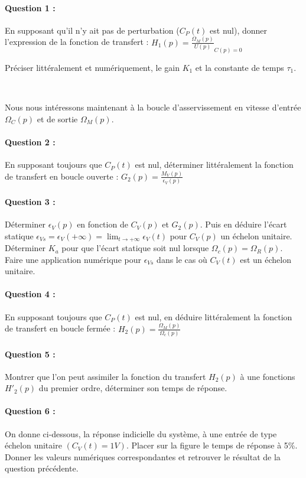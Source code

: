 \paragraph{Question 1 :} En supposant qu'il n'y ait pas de perturbation ($C_P(t)$ est nul), donner l'expression de la fonction de transfert : $H_1(p)=\frac{\Omega_M(p)}{U(p)}_{C(p)=0}$

Préciser littéralement et numériquement, le gain $K_1$ et la constante de temps $\tau_1$.

~\

Nous nous intéressons maintenant à la boucle d'asservissement en vitesse d'entrée $\Omega_C(p)$ et de sortie $\Omega_M(p)$.

\paragraph{Question 2 :} En supposant toujours que $C_P(t)$ est nul, déterminer littéralement la fonction de transfert en boucle ouverte : $G_2(p)=\frac{M_V(p)}{\epsilon_V(p)}$	

\paragraph{Question 3 :} Déterminer $\epsilon_V(p)$ en fonction de $C_V(p)$ et $G_2(p)$. Puis en déduire l'écart statique
$ \displaystyle \epsilon_{Vs}=\epsilon_V(+\infty)=\lim_{t\rightarrow + \infty}\epsilon_V(t)$ pour $C_V(p)$ un échelon unitaire. Déterminer $K_a$ pour que l'écart statique soit nul lorsque $\Omega_c(p)=\Omega_R(p)$. Faire une application numérique pour $\epsilon_{Vs}$ dans le cas où $C_V(t)$ est un échelon unitaire.

\paragraph{Question 4 :} En supposant toujours que $C_P(t)$ est nul, en déduire littéralement la fonction de transfert en boucle fermée : $H_2(p)=\frac{\Omega_M(p)}{\Omega_c(p)}$	

\paragraph{Question 5 :} Montrer que l'on peut assimiler la fonction du transfert $H_2(p)$ à une fonctions $H'_2(p)$ du premier ordre, déterminer son temps de réponse.

\paragraph{Question 6 :} On donne ci-dessous, la réponse indicielle du système, à une entrée de type échelon unitaire $(C_V(t)=1V)$. Placer sur la figure le temps de réponse à 5\%. Donner les valeurs numériques correspondantes et retrouver le résultat de la question précédente.

